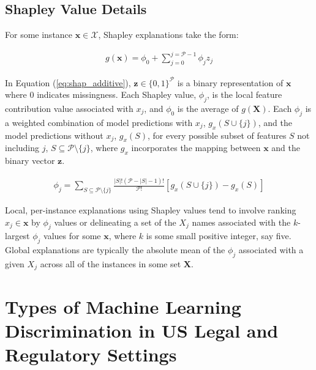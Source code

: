 \documentclass[information,article,accept,moreauthors,pdftex]{Definitions/mdpi}
\begin{document}
\subsection{Shapley Value Details}\label{a_ssec:shap}

For some instance $\mathbf{x} \in \mathcal{X}$, Shapley explanations take the form: 

\begin{equation}
\label{eq:shap_additive}
\begin{aligned}
g(\mathbf{x}) = \phi_0 + \sum_{j=0}^{j=\mathcal{P} - 1} \phi_j z_j
\end{aligned}
\end{equation}

 In Equation (\ref{eq:shap_additive}), $\mathbf{z} \in \{0,1\}^\mathcal{P}$ is a binary representation of $\mathbf{x}$ where 0 indicates missingness. Each Shapley value, $\phi_j$, is the local feature contribution value associated with $x_j$, and $\phi_0$ is the average of $g(\mathbf{X})$. Each $\phi_j$ is a weighted combination of model predictions with $x_j$, $g_x(S \cup \{j\})$, and the model predictions without $x_j$, $g_x(S)$, for every possible subset of features $S$ not including $j$, $S \subseteq \mathcal{P} \setminus \{j\}$, where $g_x$ incorporates the mapping between $\mathbf{x}$ and the binary vector $\mathbf{z}$. 

\begin{equation}
\label{eq:shap_contrib}
\begin{aligned}
\phi_{j} = \sum_{S \subseteq \mathcal{P} \setminus \{j\}}\frac{|S|!(\mathcal{P} -|S| -1)!}{\mathcal{P}!}[g_x(S \cup \{j\}) - g_x(S)]
\end{aligned}
\end{equation}

 Local, per-instance explanations using Shapley values tend to involve ranking $x_j \in \mathbf{x}$ by $\phi_j$ values or delineating a set of the $X_j$ names associated with the $k$-largest $\phi_j$ values for some $\mathbf{x}$, where $k$ is some small positive integer, say five. Global explanations are typically the absolute mean of the $\phi_j$ associated with a given $X_j$ across all of the instances in some set $\mathbf{X}$.

\section{Types of Machine Learning Discrimination in US Legal and Regulatory Settings}\label{a_sec:types}
\end{document}
